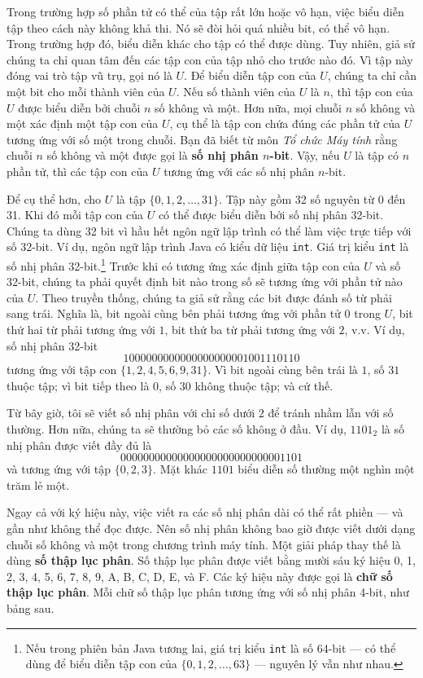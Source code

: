 Trong trường hợp số phần tử có thể của tập rất lớn hoặc vô hạn, việc biểu diễn tập theo cách này không khả thi. Nó sẽ đòi hỏi quá nhiều bit, có thể vô hạn. Trong trường hợp đó, biểu diễn khác cho tập có thể được dùng. Tuy nhiên, giả sử chúng ta chỉ quan tâm đến các tập con của tập nhỏ cho trước nào đó. Vì tập này đóng vai trò tập vũ trụ, gọi nó là $U$. Để biểu diễn tập con của $U$, chúng ta chỉ cần một bit cho mỗi thành viên của $U$. Nếu số thành viên của $U$ là $n$, thì tập con của $U$ được biểu diễn bởi chuỗi $n$ số không và một. Hơn nữa, mọi chuỗi $n$ số không và một xác định một tập con của $U$, cụ thể là tập con chứa đúng các phần tử của $U$ tương ứng với số một trong chuỗi. Bạn đã biết từ môn \textit{Tổ chức Máy tính} rằng chuỗi $n$ số không và một được gọi là \textbf{số nhị phân $n$-bit}. Vậy, nếu $U$ là tập có $n$ phần tử, thì các tập con của $U$ tương ứng với các số nhị phân $n$-bit.

Để cụ thể hơn, cho $U$ là tập $\{0, 1, 2, \ldots, 31\}$. Tập này gồm 32 số nguyên từ 0 đến 31. Khi đó mỗi tập con của $U$ có thể được biểu diễn bởi số nhị phân 32-bit. Chúng ta dùng 32 bit vì hầu hết ngôn ngữ lập trình có thể làm việc trực tiếp với số 32-bit. Ví dụ, ngôn ngữ lập trình Java có kiểu dữ liệu \texttt{int}. Giá trị kiểu \texttt{int} là số nhị phân 32-bit.\footnote{Nếu trong phiên bản Java tương lai, giá trị kiểu \texttt{int} là số 64-bit --- có thể dùng để biểu diễn tập con của $\{0, 1, 2, \ldots, 63\}$ --- nguyên lý vẫn như nhau.} Trước khi có tương ứng xác định giữa tập con của $U$ và số 32-bit, chúng ta phải quyết định bit nào trong số sẽ tương ứng với phần tử nào của $U$. Theo truyền thống, chúng ta giả sử rằng các bit được đánh số từ phải sang trái. Nghĩa là, bit ngoài cùng bên phải tương ứng với phần tử $0$ trong $U$, bit thứ hai từ phải tương ứng với $1$, bit thứ ba từ phải tương ứng với $2$, v.v. Ví dụ, số nhị phân 32-bit
\[
1000000000000000000001001110110
\]
tương ứng với tập con $\{1, 2, 4, 5, 6, 9, 31\}$. Vì bit ngoài cùng bên trái là $1$, số $31$ thuộc tập; vì bit tiếp theo là $0$, số $30$ không thuộc tập; và cứ thế.

Từ bây giờ, tôi sẽ viết số nhị phân với chỉ số dưới $2$ để tránh nhầm lẫn với số thường. Hơn nữa, chúng ta sẽ thường bỏ các số không ở đầu. Ví dụ, $1101_2$ là số nhị phân được viết đầy đủ là
\[
00000000000000000000000000001101
\]
và tương ứng với tập $\{0, 2, 3\}$. Mặt khác $1101$ biểu diễn số thường một nghìn một trăm lẻ một.

Ngay cả với ký hiệu này, việc viết ra các số nhị phân dài có thể rất phiền --- và gần như không thể đọc được. Nên số nhị phân không bao giờ được viết dưới dạng chuỗi số không và một trong chương trình máy tính. Một giải pháp thay thế là dùng \textbf{số thập lục phân}. Số thập lục phân được viết bằng mười sáu ký hiệu 0, 1, 2, 3, 4, 5, 6, 7, 8, 9, A, B, C, D, E, và F. Các ký hiệu này được gọi là \textbf{chữ số thập lục phân}. Mỗi chữ số thập lục phân tương ứng với số nhị phân 4-bit, như bảng sau.

